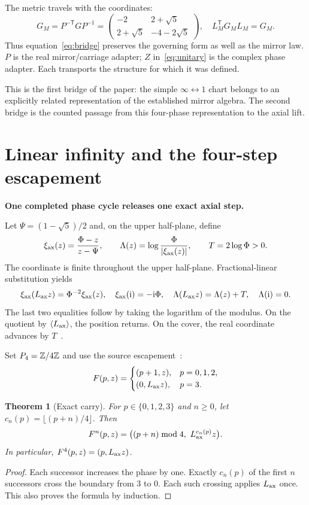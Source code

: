 \documentclass[11pt]{article}
\newtheorem{theorem}{Theorem}[section]
\theoremstyle{definition}\newtheorem{definition}[theorem]{Definition}
\newcommand{\mi}{\mathrm i}\newcommand{\tr}{\mathsf T}
\newcommand{\lead}[1]{\textbf{#1}\par}
\newcommand{\page}{\clearpage}
\begin{document}
The metric travels with the coordinates:
\begin{equation}
 G_M=P^{-\tr}GP^{-1}=
 \begin{pmatrix}-2&2+\sqrt5\\2+\sqrt5&-4-2\sqrt5\end{pmatrix},
 \quad L_M^{\tr}G_ML_M=G_M.
\end{equation}
Thus equation~\eqref{eq:bridge} preserves the governing form as well as the mirror law. $P$ is the real mirror/carriage adapter; $Z$ in~\eqref{eq:unitary} is the complex phase adapter. Each transports the structure for which it was defined.

This is the first bridge of the paper: the simple $\infty\leftrightarrow1$ chart belongs to an explicitly related representation of the established mirror algebra. The second bridge is the counted passage from this four-phase representation to the axial lift.

\page
\section{Linear infinity and the four-step escapement}
\lead{One completed phase cycle releases one exact axial step.}
Let $\Psi=(1-\sqrt5)/2$ and, on the upper half-plane, define
\begin{equation}
 \xi_{\mathrm{ax}}(z)=\frac{\Phi-z}{z-\Psi},\qquad
 \Lambda(z)=\log\frac{\Phi}{|\xi_{\mathrm{ax}}(z)|},\qquad T=2\log\Phi>0.
 \label{eq:axcoord}
\end{equation}
The coordinate is finite throughout the upper half-plane. Fractional-linear substitution yields
\begin{equation}
 \xi_{\ax}(L_{\ax}z)=\Phi^{-2}\xi_{\ax}(z),\quad
 \xi_{\ax}(\mi)=-\mi\Phi,\quad
 \Lambda(L_{\ax}z)=\Lambda(z)+T,\quad\Lambda(\mi)=0.
 \label{eq:translation}
\end{equation}
The last two equalities follow by taking the logarithm of the modulus. On the quotient by $\langle L_{\mathrm{ax}}\rangle$, the position returns. On the cover, the real coordinate advances by $T$~\cite{LI}.

Set $P_4=\mathbb Z/4\mathbb Z$ and use the source escapement~\cite[\S V]{METL}:
\begin{equation}
 F(p,z)=\begin{cases}(p+1,z),&p=0,1,2,\\(0,L_{\mathrm{ax}}z),&p=3.\end{cases}
 \label{eq:escape}
\end{equation}
\begin{theorem}[Exact carry]
For $p\in\{0,1,2,3\}$ and $n\ge0$, let $c_n(p)=\lfloor(p+n)/4\rfloor$. Then
\begin{equation}
 F^n(p,z)=\bigl((p+n)\bmod4,\ L_{\ax}^{c_n(p)}z\bigr).
 \label{eq:carry}
\end{equation}
In particular, $F^4(p,z)=(p,L_{\mathrm{ax}}z)$.
\end{theorem}
\begin{proof}
Each successor increases the phase by one. Exactly $c_n(p)$ of the first $n$ successors cross the boundary from $3$ to $0$. Each such crossing applies $L_{\mathrm{ax}}$ once. This also proves the formula by induction.
\end{proof}
\end{document}
